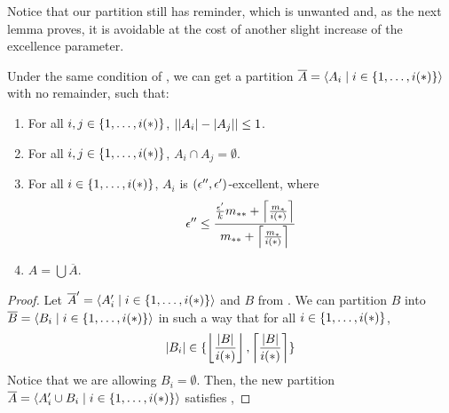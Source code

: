     Notice that our partition still has reminder, which is unwanted and, as the next lemma proves,
    it is avoidable at the cost of another slight increase of the excellence parameter.

    \begin{lemma}[Claim 5.14.2] \label{lem:existance_of_excellent_partition_with_equal_size_and_no_remainder}
        Under the same condition of , we can get a
        partition $\overline{A} = \left< A_i \mid i \in \{ 1, \dots, i(*) \} \right>$ with no remainder, such that:
        \begin{enumerate}[label=(\alph*), ref=\alph*]
            \item \label{itm:existance_of_excellent_partition_with_equal_size_and_no_remainder.a}
                For all $i, j \in \{ 1, \dots, i(*) \}$, $| | A_i |- | A_j | | \leq 1$.
            \item \label{itm:existance_of_excellent_partition_with_equal_size_and_no_remainder.b}
                For all $i, j \in \{ 1, \dots, i(*) \}$, $A_i \cap A_j = \emptyset$.
            \item \label{itm:existance_of_excellent_partition_with_equal_size_and_no_remainder.c}
                For all $i \in \{ 1, \dots, i(*) \}$, $A_i$ is $( \epsilon'', \epsilon' )$-excellent, where
                \[
                    \epsilon'' \leq \frac{\frac{\epsilon'}{k} m_{**} + \left\lceil \frac{m_*}{i(*)} \right\rceil}{m_{**} + \left\lceil \frac{m_*}{i(*)} \right\rceil}
                \]
            \item \label{itm:existance_of_excellent_partition_with_equal_size_and_no_remainder.d} $A = \bigcup \overline{A}$.
        \end{enumerate}
        \begin{proof}
            Let $\overline{A}' = \left< A_i' \mid i \in \{ 1, \dots, i(*) \} \right>$ and $B$ from
            .
            We can partition $B$ into $\overline{B} = \left< B_i \mid i \in \{ 1, \dots, i(*) \} \right>$ in such a way that
            for all $i \in \{ 1, \dots, i(*) \}$,
            \[
                |B_i| \in \{ \left\lfloor \frac{| B |}{i(*)} \right\rfloor, \left\lceil \frac{| B |}{i(*)} \right\rceil \}
            \]
            Notice that we are allowing $B_i = \emptyset$.
            Then, the new partition $\overline{A} = \left< A_i' \cup B_i \mid i \in \{ 1, \dots, i(*) \} \right>$ satisfies
            ,

\end{proof}
\end{lemma}
